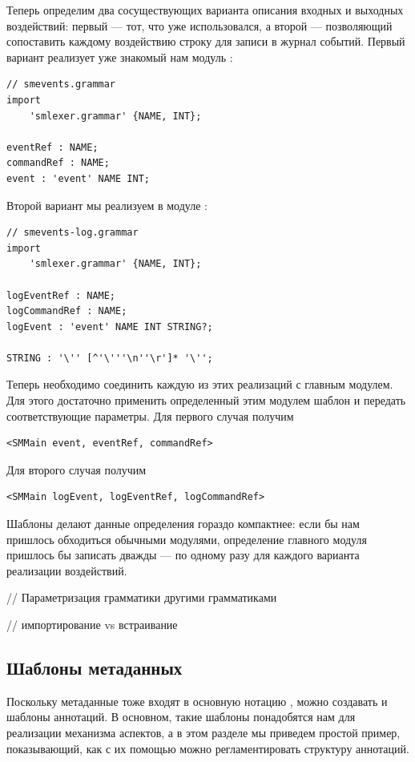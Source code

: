 Теперь определим два сосуществующих варианта описания входных и выходных воздействий: первый --- тот, что уже использовался, а второй --- позволяющий сопоставить каждому воздействию строку для записи в журнал событий. Первый вариант реализует уже знакомый нам модуль :
\begin{lstlisting}
// smevents.grammar
import 
	'smlexer.grammar' {NAME, INT};
	
eventRef : NAME;
commandRef : NAME;
event : 'event' NAME INT;
\end{lstlisting}
Второй вариант мы реализуем в модуле :
\begin{lstlisting}
// smevents-log.grammar
import 
	'smlexer.grammar' {NAME, INT};
	
logEventRef : NAME;
logCommandRef : NAME;
logEvent : 'event' NAME INT STRING?;

STRING : '\'' [^'\'''\n''\r']* '\'';
\end{lstlisting}

Теперь необходимо соединить каждую из этих реализаций с главным модулем. Для этого достаточно применить определенный этим модулем шаблон и передать соответствующие параметры. Для первого случая получим
\begin{lstlisting}
<SMMain event, eventRef, commandRef>
\end{lstlisting}
Для второго случая получим
\begin{lstlisting}
<SMMain logEvent, logEventRef, logCommandRef>
\end{lstlisting}
Шаблоны делают данные определения гораздо компактнее: если бы нам пришлось обходиться обычными модулями, определение главного модуля пришлось бы записать дважды --- по одному разу для каждого варианта реализации воздействий.

// Параметризация грамматики другими грамматиками

// импортирование vs встраивание

\subsection{Шаблоны метаданных}

Поскольку метаданные тоже входят в основную нотацию , можно создавать и шаблоны аннотаций. В основном, такие шаблоны понадобятся нам для реализации механизма аспектов, а в этом разделе мы приведем простой пример, показывающий, как с их помощью можно регламентировать структуру аннотаций.

